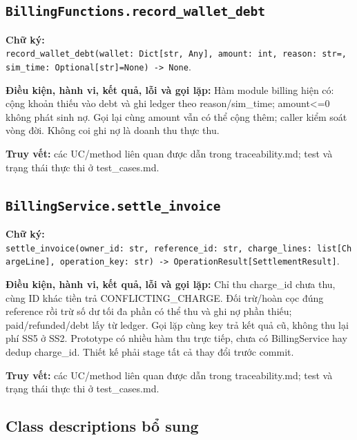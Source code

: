 \documentclass[11pt,a4paper]{article}
\begin{document}
\hypertarget{billingfunctions.record_wallet_debt}{%
\subsection{\texorpdfstring{\texttt{BillingFunctions.record\_wallet\_debt}}{BillingFunctions.record\_wallet\_debt}}\label{billingfunctions.record_wallet_debt}}

\textbf{Chữ ký:}
\texttt{record\_wallet\_debt(wallet:\ Dict{[}str,\ Any{]},\ amount:\ int,\ reason:\ str=\textquotesingle{}\textquotesingle{},\ sim\_time:\ Optional{[}str{]}=None)\ -\textgreater{}\ None}.

\textbf{Điều kiện, hành vi, kết quả, lỗi và gọi lặp:} Hàm module billing
hiện có: cộng khoản thiếu vào debt và ghi ledger theo reason/sim\_time;
amount\textless=0 không phát sinh nợ. Gọi lại cùng amount vẫn có thể
cộng thêm; caller kiểm soát vòng đời. Không coi ghi nợ là doanh thu thực
thu.

\textbf{Truy vết:} các UC/method liên quan được dẫn trong
traceability.md; test và trạng thái thực thi ở test\_cases.md.

\hypertarget{billingservice.settle_invoice}{%
\subsection{\texorpdfstring{\texttt{BillingService.settle\_invoice}}{BillingService.settle\_invoice}}\label{billingservice.settle_invoice}}

\textbf{Chữ ký:}
\texttt{settle\_invoice(owner\_id:\ str,\ reference\_id:\ str,\ charge\_lines:\ list{[}ChargeLine{]},\ operation\_key:\ str)\ -\textgreater{}\ OperationResult{[}SettlementResult{]}}.

\textbf{Điều kiện, hành vi, kết quả, lỗi và gọi lặp:} Chỉ thu charge\_id
chưa thu, cùng ID khác tiền trả CONFLICTING\_CHARGE. Đối trừ/hoàn cọc
đúng reference rồi trừ số dư tối đa phần có thể thu và ghi nợ phần
thiếu; paid/refunded/debt lấy từ ledger. Gọi lặp cùng key trả kết quả
cũ, không thu lại phí SS5 ở SS2. Prototype có nhiều hàm thu trực tiếp,
chưa có BillingService hay dedup charge\_id. Thiết kế phải stage tất cả
thay đổi trước commit.

\textbf{Truy vết:} các UC/method liên quan được dẫn trong
traceability.md; test và trạng thái thực thi ở test\_cases.md.

\hypertarget{class-descriptions-bux1ed5-sung}{%
\subsection{Class descriptions bổ
sung}\label{class-descriptions-bux1ed5-sung}}
\end{document}
